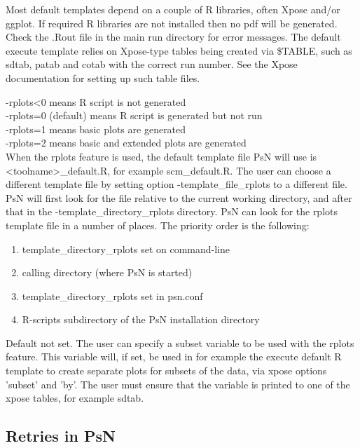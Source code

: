 Most default templates depend on a couple of R libraries, often Xpose and/or ggplot. If required R libraries are not installed then
no pdf will be generated. Check the .Rout file in the main run directory for error messages.
The default execute template relies on Xpose-type tables being created via \$TABLE, such as sdtab, patab and cotab with
the correct run number. See the Xpose documentation for setting up such table files.
\begin{optionlist}
-rplots<0 means R script is not generated\\ 
-rplots=0 (default) means R script is generated but not run\\ 
-rplots=1 means basic plots are generated\\													  
-rplots=2 means basic and extended plots are generated\\													  
\nextopt
{}
When the rplots feature is used, the default template file PsN will use is <toolname>\_default.R,
for example scm\_default.R. The user can choose a different template file
by setting option -template\_file\_rplots to a different file. 
PsN will first look for the file relative to the current working directory, 
and after that in the -template\_directory\_rplots directory.
\nextopt
{}
PsN can look for the rplots template file in a number of places. The priority order is the
following:
\begin{enumerate}
\item template\_directory\_rplots set on command-line 
\item calling directory (where PsN is started)
\item template\_directory\_rplots set in psn.conf 
\item R-scripts subdirectory of the PsN installation directory
\end{enumerate}
\nextopt
{}
Default not set. The user can specify a subset variable to be used with the rplots feature. This variable
will, if set, be used in for example the execute default R template to create separate plots for
subsets of the data, via xpose options 'subset' and 'by'. The user must ensure that the variable
is printed to one of the xpose tables, for example sdtab.
\nextopt
\end{optionlist}

\subsection{Retries in PsN}

